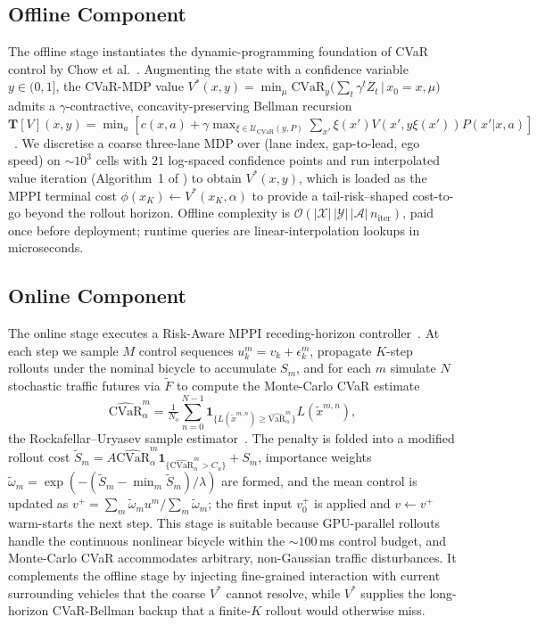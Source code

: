 \documentclass[letterpaper, 10 pt, conference]{ieeeconf}  %
\begin{document}
\subsection{Offline Component}
The offline stage instantiates the dynamic-programming foundation of CVaR control by Chow et al.~\cite{chow_cvarmdp}. Augmenting the state with a confidence variable $y\!\in\!(0,1]$, the CVaR-MDP value $V^{*}(x,y)\!=\!\min_{\mu}\mathrm{CVaR}_y\!\big(\sum_{t}\gamma^{t}Z_t\,|\,x_0\!=\!x,\mu\big)$ admits a $\gamma$-contractive, concavity-preserving Bellman recursion $\mathbf{T}[V](x,y)\!=\!\min_a[c(x,a)\!+\!\gamma\max_{\xi\in\mathcal{U}_{\mathrm{CVaR}}(y,P)}\sum_{x'}\xi(x')V(x',y\xi(x'))P(x'|x,a)]$~\cite{chow_cvarmdp}. We discretise a coarse three-lane MDP over (lane index, gap-to-lead, ego speed) on $\sim\!10^{3}$ cells with $21$ log-spaced confidence points and run interpolated value iteration (Algorithm~1 of \cite{chow_cvarmdp}) to obtain $V^{*}(x,y)$, which is loaded as the MPPI terminal cost $\phi(x_K)\!\leftarrow\!V^{*}(x_K,\alpha)$ to provide a tail-risk--shaped cost-to-go beyond the rollout horizon. Offline complexity is $\mathcal{O}(|\mathcal{X}|\,|\mathcal{Y}|\,|\mathcal{A}|\,n_{\mathrm{iter}})$, paid once before deployment; runtime queries are linear-interpolation lookups in microseconds.

\subsection{Online Component}
The online stage executes a Risk-Aware MPPI receding-horizon controller~\cite{mppi,ramppi}. At each step we sample $M$ control sequences $u_k^{m}\!=\!v_k\!+\!\epsilon_k^{m}$, propagate $K$-step rollouts under the nominal bicycle to accumulate $S_m$, and for each $m$ simulate $N$ stochastic traffic futures via $\tilde F$ to compute the Monte-Carlo CVaR estimate
\begin{equation}\label{eq:cvar_mc}
\widehat{\mathrm{CVaR}}_\alpha^{m}=\tfrac{1}{N_o}\!\sum_{n=0}^{N-1}\!\mathbf{1}_{\{L(\tilde{x}^{m,n})\ge\widehat{\mathrm{VaR}}_\alpha^{m}\}}L(\tilde{x}^{m,n}),
\end{equation}
the Rockafellar--Uryasev sample estimator~\cite{rockafellar,ramppi}. The penalty is folded into a modified rollout cost $\tilde{S}_m\!=\!A\widehat{\mathrm{CVaR}}_\alpha^{m}\mathbf{1}_{\{\widehat{\mathrm{CVaR}}_\alpha^{m}>C_u\}}\!+\!S_m$, importance weights $\tilde{\omega}_m\!=\!\exp(-(\tilde{S}_m\!-\!\min_m\tilde{S}_m)/\lambda)$ are formed, and the mean control is updated as $v^{+}\!=\!\sum_m\tilde{\omega}_m u^{m}/\sum_m\tilde{\omega}_m$; the first input $v^{+}_0$ is applied and $v\!\leftarrow\!v^{+}$ warm-starts the next step. This stage is suitable because GPU-parallel rollouts handle the continuous nonlinear bicycle within the $\sim\!100$\,ms control budget, and Monte-Carlo CVaR accommodates arbitrary, non-Gaussian traffic disturbances. It complements the offline stage by injecting fine-grained interaction with current surrounding vehicles that the coarse $V^{*}$ cannot resolve, while $V^{*}$ supplies the long-horizon CVaR-Bellman backup that a finite-$K$ rollout would otherwise miss.
\end{document}
